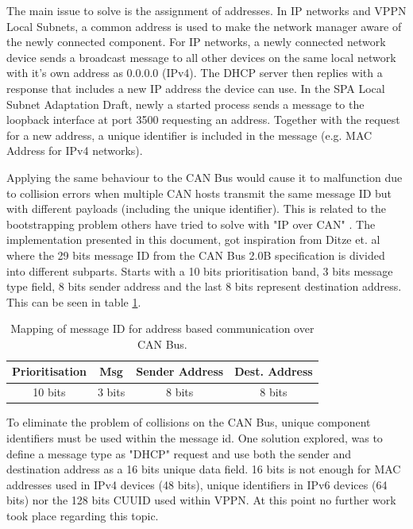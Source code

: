 The main issue to solve is the assignment of addresses. In IP networks and VPPN Local
Subnets, a common address is used to make the network manager aware of the newly
connected component. For IP networks, a newly connected network device sends a
broadcast message to all other devices on the same local network with it's own
address as 0.0.0.0 (IPv4). The DHCP server then replies with a response that
includes a new IP address the device can use. In the SPA Local Subnet
Adaptation Draft, newly a started process sends a message to the loopback
interface at port 3500 requesting an address. Together with the request for a
new address, a unique identifier is included in the message (e.g. MAC Address
for IPv4 networks).

Applying the same behaviour to the CAN Bus would cause it to
malfunction due to collision errors when multiple CAN hosts transmit the same
message ID but with different payloads (including the unique identifier).
This is related to the bootstrapping problem others have tried to solve with
"IP over CAN" \cite{web:draft-ip_over_can, web:porting_ip_can}. The implementation presented in this document, got inspiration from
Ditze et. al \cite{web:porting_ip_can} where the 29 bits message ID from the
CAN Bus 2.0B specification is divided into different subparts. Starts with a 10
bits prioritisation band, 3 bits message type field, 8 bits sender address and
the last 8 bits represent destination address. This can be seen in table
\ref{table:mapping_message_id_to_ip}.

\begin{table}
\centering
    \caption{Mapping of message ID for address based communication over CAN
    Bus.}
    \begin{tabular}{|c|c|c|c|} \hline
    \label{table:mapping_message_id_to_ip}
    Prioritisation & Msg & Sender Address & Dest. Address  \\ \hline
            10 bits & 3 bits & 8 bits & 8 bits \\ \hline
    \end{tabular}
\end{table}

To eliminate the problem of collisions on the CAN Bus, unique component
identifiers must be used within the message id. One solution explored, was to
define a message type as "DHCP" request and use both the sender and destination
address as a 16 bits unique data field. 16 bits is not enough for MAC addresses
used in IPv4 devices (48 bits), unique identifiers in IPv6 devices (64 bits)
nor the 128 bits CUUID used within VPPN. At this point no further work took
place regarding this topic.

